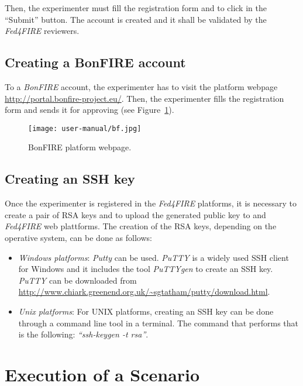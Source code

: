 Then, the experimenter must fill the registration form and to click in the ``Submit''
button. The account is created and it shall be validated by the \emph{Fed4FIRE}
reviewers. 

\subsection{Creating a BonFIRE account}

To a \emph{BonFIRE} account, the experimenter has to visit the platform webpage
\url{http://portal.bonfire-project.eu/}. Then, the experimenter fills the
registration form and sends it for approving (see Figure~\ref{fig:bonfire-account}). 

\begin{figure}[!h]
\begin{center}
\texttt{[image: user-manual/bf.jpg]}
\caption{BonFIRE platform webpage.}
\label{fig:bonfire-account}
\end{center}
\end{figure}

\subsection{Creating an SSH key}

Once the experimenter is registered in the \emph{Fed4FIRE} platforms, it is
necessary to create a pair of \ac{RSA} keys and to upload the generated public key to
\bonfire and \emph{Fed4FIRE} web plattforms. The creation of the \ac{RSA} keys,
depending on the operative system, can be done as follows:
\begin{itemize}
\item \emph{Windows platforms}: \emph{Putty} can be used. \emph{PuTTY} is a widely
  used \ac{SSH} client for Windows and it includes the tool \emph{PuTTYgen} to create
  an \ac{SSH} key. \emph{PuTTY} can be downloaded from
  \url{http://www.chiark.greenend.org.uk/~sgtatham/putty/download.html}.

\item \emph{Unix platforms}: For UNIX platforms, creating an \ac{SSH} key can be
  done through a command line tool in a terminal. The command that
  performs that is the following: \emph{``ssh-keygen -t rsa''}.

\end{itemize}


\section{Execution of a Scenario}

